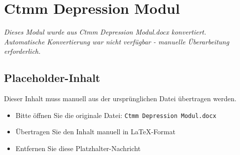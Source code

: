 
\section{Ctmm Depression Modul}
\label{sec:ctmm-depression-modul}

\begin{center}
\textit{Dieses Modul wurde aus Ctmm Depression Modul.docx konvertiert.\\
Automatische Konvertierung war nicht verfügbar - manuelle Überarbeitung erforderlich.}
\end{center}


\subsection{Placeholder-Inhalt}

Dieser Inhalt muss manuell aus der ursprünglichen Datei übertragen werden.

\begin{itemize}
\item Bitte öffnen Sie die originale Datei: \texttt{Ctmm Depression Modul.docx}
\item Übertragen Sie den Inhalt manuell in LaTeX-Format
\item Entfernen Sie diese Platzhalter-Nachricht
\end{itemize}
